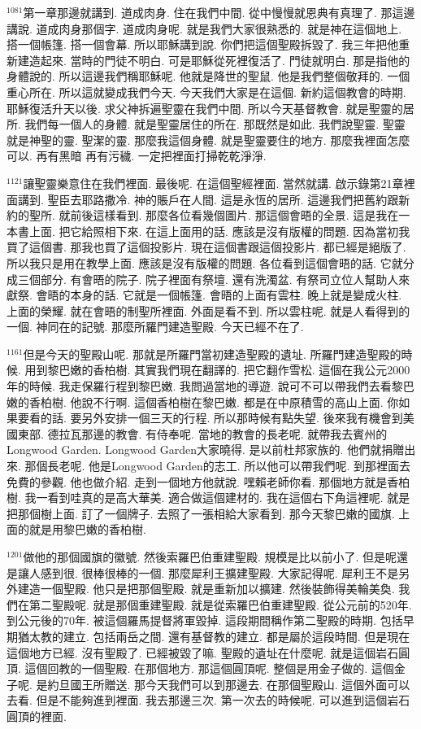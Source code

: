 \documentclass{book}
\begin{document}
$^{1081}$第一章那邊就講到.
道成肉身.
住在我們中間.
從中慢慢就恩典有真理了.
那這邊講說.
道成肉身那個字.
道成肉身呢.
就是我們大家很熟悉的.
就是神在這個地上.
搭一個帳篷.
搭一個會幕.
所以耶穌講到說.
你們把這個聖殿拆毀了.
我三年把他重新建造起來.
當時的門徒不明白.
可是耶穌從死裡復活了.
門徒就明白.
那是指他的身體說的.
所以這邊我們稱耶穌呢.
他就是降世的聖鼠.
他是我們整個敬拜的.
一個重心所在.
所以這就變成我們今天.
今天我們大家是在這個.
新約這個教會的時期.
耶穌復活升天以後.
求父神拆遍聖靈在我們中間.
所以今天基督教會.
就是聖靈的居所.
我們每一個人的身體.
就是聖靈居住的所在.
那既然是如此.
我們說聖靈.
聖靈就是神聖的靈.
聖潔的靈.
那麼我這個身體.
就是聖靈要住的地方.
那麼我裡面怎麼可以.
再有黑暗 再有污穢.
一定把裡面打掃乾乾淨淨.

$^{1121}$讓聖靈樂意住在我們裡面.
最後呢.
在這個聖經裡面.
當然就講.
啟示錄第21章裡面講到.
聖臣去耶路撒冷.
神的賬戶在人間.
這是永恆的居所.
這邊我們把舊約跟新約的聖所.
就前後這樣看到.
那麼各位看幾個圖片.
那這個會晤的全景.
這是我在一本書上面.
把它給照相下來.
在這上面用的話.
應該是沒有版權的問題.
因為當初我買了這個書.
那我也買了這個投影片.
現在這個書跟這個投影片.
都已經是絕版了.
所以我只是用在教學上面.
應該是沒有版權的問題.
各位看到這個會晤的話.
它就分成三個部分.
有會晤的院子.
院子裡面有祭壇.
還有洗濁盆.
有祭司立位人幫助人來獻祭.
會晤的本身的話.
它就是一個帳篷.
會晤的上面有雲柱.
晚上就是變成火柱.
上面的榮耀.
就在會晤的制聖所裡面.
外面是看不到.
所以雲柱呢.
就是人看得到的一個.
神同在的記號.
那麼所羅門建造聖殿.
今天已經不在了.

$^{1161}$但是今天的聖殿山呢.
那就是所羅門當初建造聖殿的遺址.
所羅門建造聖殿的時候.
用到黎巴嫩的香柏樹.
其實我們現在翻譯的.
把它翻作雪松.
這個在我公元2000年的時候.
我走保羅行程到黎巴嫩.
我問過當地的導遊.
說可不可以帶我們去看黎巴嫩的香柏樹.
他說不行啊.
這個香柏樹在黎巴嫩.
都是在中原積雪的高山上面.
你如果要看的話.
要另外安排一個三天的行程.
所以那時候有點失望.
後來我有機會到美國東部.
德拉瓦那邊的教會.
有侍奉呢.
當地的教會的長老呢.
就帶我去賓州的Longwood Garden.
Longwood Garden大家曉得.
是以前杜邦家族的.
他們就捐贈出來.
那個長老呢.
他是Longwood Garden的志工.
所以他可以帶我們呢.
到那裡面去免費的參觀.
他也做介紹.
走到一個地方他就說.
嘿賴老師你看.
那個地方就是香柏樹.
我一看到哇真的是高大華美.
適合做這個建材的.
我在這個右下角這裡呢.
就是把那個樹上面.
訂了一個牌子.
去照了一張相給大家看到.
那今天黎巴嫩的國旗.
上面的就是用黎巴嫩的香柏樹.

$^{1201}$做他的那個國旗的徽號.
然後索羅巴伯重建聖殿.
規模是比以前小了.
但是呢還是讓人感到很.
很棒很棒的一個.
那麼犀利王擴建聖殿.
大家記得呢.
犀利王不是另外建造一個聖殿.
他只是把那個聖殿.
就是重新加以擴建.
然後裝飾得美輪美奐.
我們在第二聖殿呢.
就是那個重建聖殿.
就是從索羅巴伯重建聖殿.
從公元前的520年.
到公元後的70年.
被這個羅馬提督將軍毀掉.
這段期間稱作第二聖殿的時期.
包括早期猶太教的建立.
包括兩岳之間.
還有基督教的建立.
都是屬於這段時間.
但是現在這個地方已經.
沒有聖殿了.
已經被毀了嘛.
聖殿的遺址在什麼呢.
就是這個岩石圓頂.
這個回教的一個聖殿.
在那個地方.
那這個圓頂呢.
整個是用金子做的.
這個金子呢.
是約旦國王所贈送.
那今天我們可以到那邊去.
在那個聖殿山.
這個外面可以去看.
但是不能夠進到裡面.
我去那邊三次.
第一次去的時候呢.
可以進到這個岩石圓頂的裡面.
\end{document}
